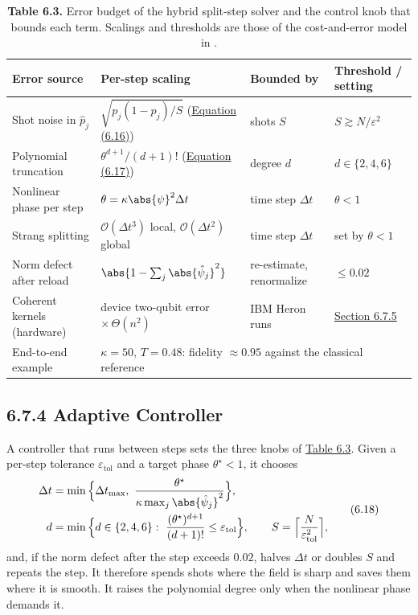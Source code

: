 \documentclass{report}
\theoremstyle{plain}
\theoremstyle{definition}
\theoremstyle{remark}
\newcommand{\bigO}[1]{\mathcal{O}\!\left(#1\right)}
\newcommand{\eps}{\varepsilon}
\begin{document}
\begin{table}[htbp]
\caption{\textbf{Table 6.3.} Error budget of the hybrid split-step solver and the control knob that bounds each term. Scalings and thresholds are those of the cost-and-error model in \cite{guo2026nonlinearwaves}.}
\label{tab:syn:errorbudget}
 \footnotesize
\begin{tabular}{llll}
\toprule
Error source & Per-step scaling & Bounded by & Threshold / setting \\
\midrule
Shot noise in $\hat p_j$ & $\sqrt{p_j(1-p_j)/S}$ (\hyperref[eq:syn:shot]{Equation (6.16)}) & shots $S$ & $S\gtrsim N/\eps^{2}$ \\
Polynomial truncation & $\theta^{d+1}/(d+1)!$ (\hyperref[eq:syn:trunc]{Equation (6.17)}) & degree $d$ & $d\in\{2,4,6\}$ \\
Nonlinear phase per step & $\theta=\kappa\abs{\psi}^{2}\Delta t$ & time step $\Delta t$ & $\theta<1$ \\
Strang splitting & $\bigO{\Delta t^{3}}$ local, $\bigO{\Delta t^{2}}$ global & time step $\Delta t$ & set by $\theta<1$ \\
Norm defect after reload & $\abs{1-\sum_j\abs{\hat\psi_j}^{2}}$ & re-estimate, renormalize & $\le 0.02$ \\
Coherent kernels (hardware) & device two-qubit error $\times\,\Theta(n^{2})$ & IBM Heron runs & \hyperref[sec:syn:waves-results]{Section 6.7.5} \\
\midrule
End-to-end example & \multicolumn{3}{l}{$\kappa=50$, $T=0.48$: fidelity $\approx 0.95$ against the classical reference} \\
\bottomrule
\end{tabular}
\end{table}

\subsection{6.7.4 Adaptive Controller}\label{sec:syn:controller}

A controller that runs between steps sets the three knobs of \hyperref[tab:syn:errorbudget]{Table 6.3}. Given a per-step tolerance $\eps_{\mathrm{tol}}$ and a target phase $\theta^{\star}<1$, it chooses
\hypertarget{eq:syn:controller}{}\[
\begin{aligned}
  \Delta t&=\min\Big\{\Delta t_{\max},\ \frac{\theta^{\star}}{\kappa\max_j\abs{\hat\psi_j}^{2}}\Big\},\\
  d&=\min\Big\{d\in\{2,4,6\}:\ \frac{(\theta^{\star})^{d+1}}{(d+1)!}\le\eps_{\mathrm{tol}}\Big\},\qquad
  S=\Big\lceil\frac{N}{\eps_{\mathrm{tol}}^{2}}\Big\rceil,
\end{aligned}
\tag{6.18}\]
and, if the norm defect after the step exceeds $0.02$, halves $\Delta t$ or doubles $S$ and repeats the step. It therefore spends shots where the field is sharp and saves them where it is smooth. It raises the polynomial degree only when the nonlinear phase demands it.
\end{document}
